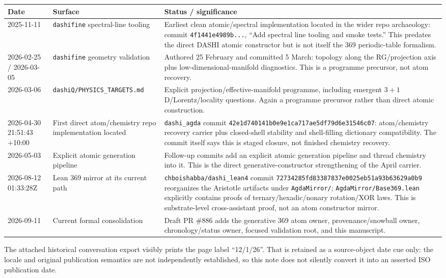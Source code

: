 \documentclass[11pt,a4paper]{article}
\theoremstyle{remark}
\begin{document}
\begin{longtable}{p{}p{}p{}}
\toprule
Date & Surface & Status / significance\\
\midrule
2025-11-11 & \texttt{dashifine} spectral-line tooling & Earliest clean atomic/spectral implementation located in the wider repo archaeology: commit \texttt{4f1441e4989b...}, ``Add spectral line tooling and smoke tests.'' This predates the direct DASHI atomic constructor but is not itself the 369 periodic-table formalism.\\
2026-02-25 / 2026-03-05 & \texttt{dashifine} geometry validation & Authored 25 February and committed 5 March: topology along the RG/projection axis plus low-dimensional-manifold diagnostics. This is a programme precursor, not atom recovery.\\
2026-03-06 & \texttt{dashiQ/PHYSICS\_TARGETS.md} & Explicit projection/effective-manifold programme, including emergent $3+1$D/Lorentz/locality questions. Again a programme precursor rather than direct atomic construction.\\
2026-04-30 21:51:43 +10:00 & First direct atom/chemistry repo implementation located & \texttt{dashi\_agda} commit \texttt{42e1d740141b0e9e1ca717ae5df79d6e31546c07}: atom/chemistry recovery carrier plus closed-shell stability and shell-filling dictionary compatibility. The commit itself says this is staged closure, not finished chemistry recovery.\\
2026-05-03 & Explicit atomic generation pipeline & Follow-up commits add an explicit atomic generation pipeline and thread chemistry into it. This is the direct generative-constructor strengthening of the April carrier.\\
2026-08-12 01:33:28Z & Lean 369 mirror at its current path & \texttt{chboishabba/dashi\_lean4} commit \texttt{72734285fd83387837e0025eb51a93b63629a0b9} reorganizes the Aristotle artifacts under \texttt{AgdaMirror/}; \texttt{AgdaMirror/Base369.lean} explicitly contains proofs of ternary/hexadic/nonary rotation/XOR laws. This is substrate-level cross-assistant proof, not an atom constructor mirror.\\
2026-09-11 & Current formal consolidation & Draft PR \#886 adds the generative 369 atom owner, provenance/snowball owner, chronology/status owner, focused validation root, and this manuscript.\\
\bottomrule
\end{longtable}

The attached historical conversation export visibly prints the page label
``12/1/26''.  That is retained as a source-object date cue only: the locale and
original publication semantics are not independently established, so this note
does not silently convert it into an asserted ISO publication date.
\end{document}
